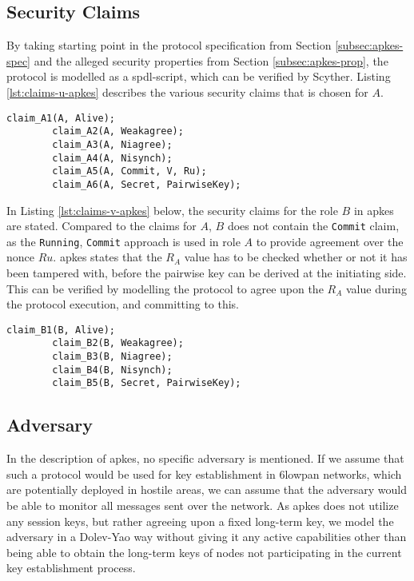 \subsection{Security Claims}

By taking starting point in the protocol specification from Section \ref{subsec:apkes-spec} and the alleged security properties from Section \ref{subsec:apkes-prop}, the protocol is modelled as a \gls{spdl}-script, which can be verified by Scyther. Listing \ref{lst:claims-u-apkes} describes the various security claims that is chosen for $A$.


\begin{lstlisting}[caption={Security claims for role A in APKES.}, label={lst:claims-u-apkes}]
		claim_A1(A, Alive);
		claim_A2(A, Weakagree);
		claim_A3(A, Niagree);
		claim_A4(A, Nisynch);
		claim_A5(A, Commit, V, Ru);
		claim_A6(A, Secret, PairwiseKey);
\end{lstlisting}

In Listing \ref{lst:claims-v-apkes} below, the security claims for the role $B$ in \gls{apkes} are stated. Compared to the claims for $A$, $B$ does not contain the \texttt{Commit} claim, as the \texttt{Running}, \texttt{Commit} approach is used in role $A$ to provide agreement over the nonce $Ru$. \gls{apkes} states that the $R_A$ value has to be checked whether or not it has been tampered with, before the pairwise key can be derived at the initiating side. This can be verified by modelling the protocol to agree upon the $R_A$ value during the protocol execution, and committing to this.

\begin{lstlisting}[caption={Security claims for role B in APKES.}, label={lst:claims-v-apkes}]
		claim_B1(B, Alive);
		claim_B2(B, Weakagree);
		claim_B3(B, Niagree);
		claim_B4(B, Nisynch);
		claim_B5(B, Secret, PairwiseKey);
\end{lstlisting}


\subsection{Adversary}

In the description of \gls{apkes}, no specific adversary is mentioned. If we assume that such a protocol would be used for key establishment in \gls{6lowpan} networks, which are potentially deployed in hostile areas, we can assume that the adversary would be able to monitor all messages sent over the network. As \gls{apkes} does not utilize any session keys, but rather agreeing upon a fixed long-term key, we model the adversary in a Dolev-Yao way without giving it any active capabilities other than being able to obtain the long-term keys of nodes not participating in the current key establishment process. 

